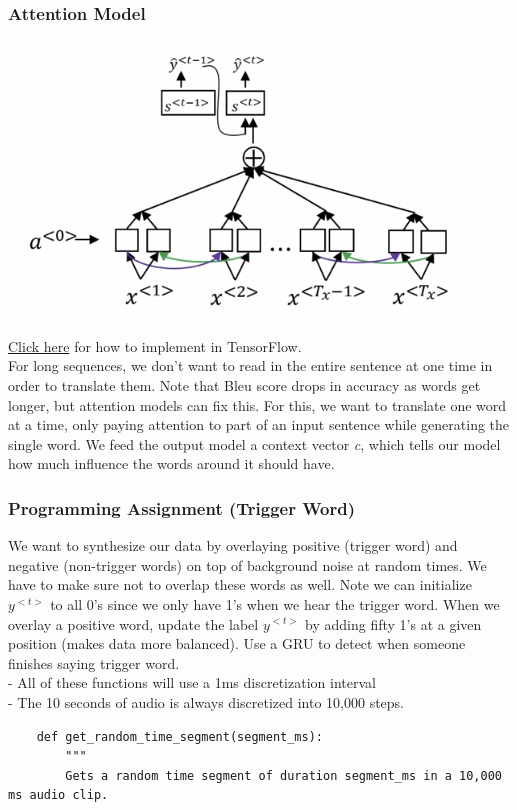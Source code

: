 \documentclass[11pt, a4paper]{article}
\begin{document}
\begin{spacing}{1.1}
	\subsubsection{Attention Model}
	\begin{center}
	\includegraphics[scale=.6]{attention_model}
	\end{center}
	\href{https://www.tensorflow.org/tutorials/text/nmt_with_attention}{Click here} for how to implement in TensorFlow. \vspace*{2mm}\\
	For long sequences, we don't want to read in the entire sentence at one time in order to translate them. Note that Bleu score drops in accuracy as words get longer, but attention models can fix this. For this, we want to translate one word at a time, only paying attention to part of an input sentence while generating the single word. We feed the output model a context vector \textit{c}, which tells our model how much influence the words around it should have.
	
	\subsubsection{Programming Assignment (Trigger Word)}
	We want to synthesize our data by overlaying positive (trigger word) and negative (non-trigger words) on top of background noise at random times. We have to make sure not to overlap these words as well. Note we can initialize $y^{<t>}$ to all 0's since we only have 1's when we hear the trigger word. When we overlay a positive word, update the label $y^{<t>}$ by adding fifty 1's at a given position (makes data more balanced). Use a GRU to detect when someone finishes saying trigger word. \vspace*{1mm}\\
	- All of these functions will use a 1ms discretization interval \\
	- The 10 seconds of audio is always discretized into 10,000 steps. 
	\begin{lstlisting}
	def get_random_time_segment(segment_ms):
		"""
		Gets a random time segment of duration segment_ms in a 10,000 ms audio clip.
		

\end{lstlisting}
\end{spacing}
\end{document}
